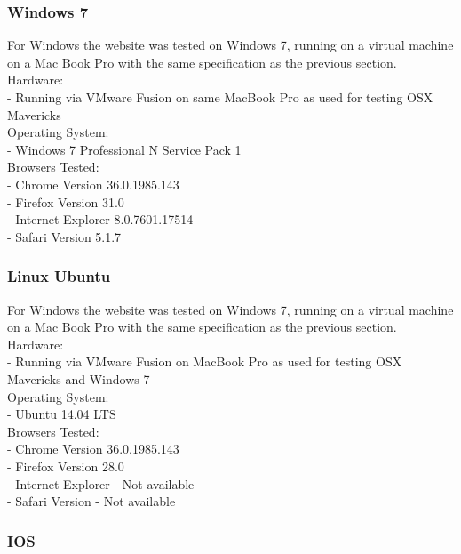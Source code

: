 \documentclass[a4paper,11pt,twoside]{article}
\begin{document}
\subsubsection*{Windows 7}

For Windows the website was tested on Windows 7, running on a virtual machine on a Mac Book Pro with the same specification as the previous section.\\

\noindent Hardware:\\
- Running via VMware Fusion on same MacBook Pro as used for testing OSX Mavericks\\

\noindent Operating System:\\
- Windows 7 Professional N Service Pack 1\\

\noindent Browsers Tested:\\
- Chrome Version 36.0.1985.143\\
- Firefox Version 31.0\\
- Internet Explorer 8.0.7601.17514\\
- Safari Version 5.1.7\\


\subsubsection*{Linux Ubuntu}

For Windows the website was tested on Windows 7, running on a virtual machine on a Mac Book Pro with the same specification as the previous section.\\

\noindent Hardware:\\
- Running via VMware Fusion on MacBook Pro as used for testing OSX Mavericks and Windows 7\\

\noindent Operating System:\\
- Ubuntu 14.04 LTS\\

\noindent Browsers Tested:\\
- Chrome Version 36.0.1985.143\\
- Firefox Version 28.0\\
- Internet Explorer - Not available\\
- Safari Version - Not available


\subsubsection*{IOS}
\end{document}
